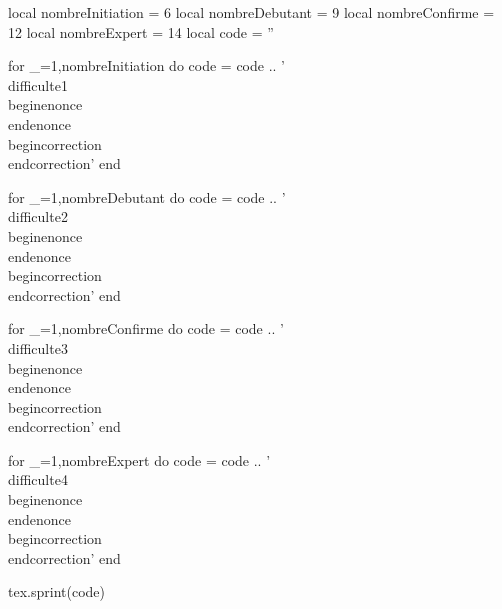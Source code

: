 \documentclass{../tex/classe-tex3R}
\renewcommand{\difficulte}[1]{
  \directlua{
    table.insert(DIFFICULTE,"#1")
    if "#1" == "1" then
      SCALING = 1.2
      N = 4
    elseif "#1" == "2" then
      SCALING = 0.9
      N = 6
    elseif "#1" == "3" then
      SCALING = 0.75
      N = 8
    elseif "#1" == "4" then
      SCALING = 0.6
      N = 10
    else
      SCALING = 1
    end
  }
}
\begin{document}
\begin{luacode*}
  local nombreInitiation = 6
  local nombreDebutant = 9
  local nombreConfirme = 12
  local nombreExpert = 14
  local code = ''

  for _=1,nombreInitiation do
    code = code .. '\\difficulte{1}\\begin{enonce}\\end{enonce}\\begin{correction}\\end{correction}'
  end

  for _=1,nombreDebutant do
    code = code .. '\\difficulte{2}\\begin{enonce}\\end{enonce}\\begin{correction}\\end{correction}'
  end

  for _=1,nombreConfirme do
    code = code .. '\\difficulte{3}\\begin{enonce}\\end{enonce}\\begin{correction}\\end{correction}'
  end

    for _=1,nombreExpert do
    code = code .. '\\difficulte{4}\\begin{enonce}\\end{enonce}\\begin{correction}\\end{correction}'
  end

  tex.sprint(code)

\end{luacode*}
\end{document}
